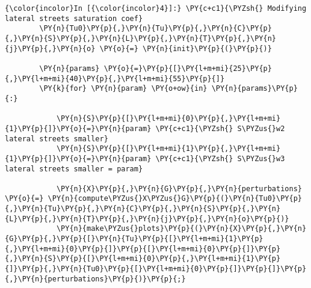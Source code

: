     \begin{Verbatim}[commandchars=\\\{\}]
{\color{incolor}In [{\color{incolor}4}]:} \PY{c+c1}{\PYZsh{} Modifying lateral streets saturation coef}
        \PY{n}{Tu0}\PY{p}{,}\PY{n}{Tu}\PY{p}{,}\PY{n}{C}\PY{p}{,}\PY{n}{S}\PY{p}{,}\PY{n}{L}\PY{p}{,}\PY{n}{T}\PY{p}{,}\PY{n}{j}\PY{p}{,}\PY{n}{o} \PY{o}{=} \PY{n}{init}\PY{p}{(}\PY{p}{)}
        
        \PY{n}{params} \PY{o}{=}\PY{p}{[}\PY{l+m+mi}{25}\PY{p}{,}\PY{l+m+mi}{40}\PY{p}{,}\PY{l+m+mi}{55}\PY{p}{]}
        \PY{k}{for} \PY{n}{param} \PY{o+ow}{in} \PY{n}{params}\PY{p}{:}
            
            \PY{n}{S}\PY{p}{[}\PY{l+m+mi}{0}\PY{p}{,}\PY{l+m+mi}{1}\PY{p}{]}\PY{o}{=}\PY{n}{param} \PY{c+c1}{\PYZsh{} S\PYZus{}w2 lateral streets smaller}
            \PY{n}{S}\PY{p}{[}\PY{l+m+mi}{1}\PY{p}{,}\PY{l+m+mi}{1}\PY{p}{]}\PY{o}{=}\PY{n}{param} \PY{c+c1}{\PYZsh{} S\PYZus{}w3 lateral streets smaller = param}
        
            \PY{n}{X}\PY{p}{,}\PY{n}{G}\PY{p}{,}\PY{n}{perturbations} \PY{o}{=} \PY{n}{compute\PYZus{}X\PYZus{}G}\PY{p}{(}\PY{n}{Tu0}\PY{p}{,}\PY{n}{Tu}\PY{p}{,}\PY{n}{C}\PY{p}{,}\PY{n}{S}\PY{p}{,}\PY{n}{L}\PY{p}{,}\PY{n}{T}\PY{p}{,}\PY{n}{j}\PY{p}{,}\PY{n}{o}\PY{p}{)}
            \PY{n}{make\PYZus{}plots}\PY{p}{(}\PY{n}{X}\PY{p}{,}\PY{n}{G}\PY{p}{,}\PY{p}{[}\PY{n}{Tu}\PY{p}{[}\PY{l+m+mi}{1}\PY{p}{,}\PY{l+m+mi}{0}\PY{p}{]}\PY{p}{[}\PY{l+m+mi}{0}\PY{p}{]}\PY{p}{,}\PY{n}{S}\PY{p}{[}\PY{l+m+mi}{0}\PY{p}{,}\PY{l+m+mi}{1}\PY{p}{]}\PY{p}{,}\PY{n}{Tu0}\PY{p}{[}\PY{l+m+mi}{0}\PY{p}{]}\PY{p}{]}\PY{p}{,}\PY{n}{perturbations}\PY{p}{)}\PY{p}{;}
\end{Verbatim}


    \begin{center}
    \end{center}
    { \hspace*{\fill} \\}
    
    \begin{center}
    \end{center}
    { \hspace*{\fill} \\}
    
    \begin{center}
    \end{center}
    { \hspace*{\fill} \\}
    

